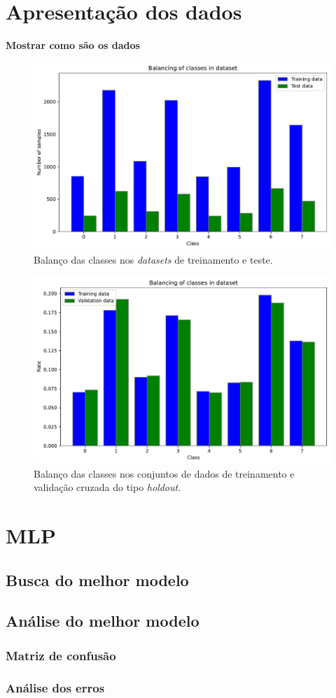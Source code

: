 
\section{Apresentação dos dados}

\textbf{Mostrar como são os dados}

\begin{figure}[h!]
	\centering
	\includegraphics[width=0.75\linewidth]{../../plot/Balancing_of_classes}
	\caption{Balanço das classes nos \textit{datasets} de treinamento e teste.}
	\label{fig:balancingofclasses}
\end{figure}

\begin{figure}[h!]
\centering
\includegraphics[width=0.75\linewidth]{../../plot/Balancing_of_classes_holdout}
\caption{Balanço das classes nos conjuntos de dados de treinamento e validação cruzada do tipo \textit{holdout}.}
\label{fig:balancingofclasses_holdout}
\end{figure}


\section{MLP}

\subsection{Busca do melhor modelo}


\subsection{Análise do melhor modelo}


\subsubsection{Matriz de confusão}


\subsubsection{Análise dos erros}

